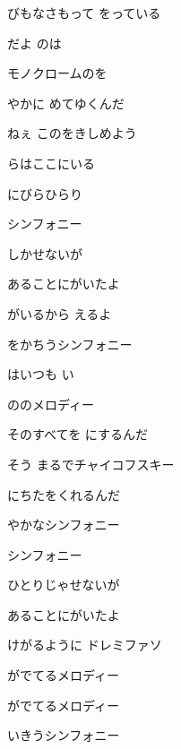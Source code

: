 \documentclass[14pt]{ltjsarticle}
\begin{document}
{  びもなさもって をっている
  \jisho{}

\item
  だよ のは
  \jisho{}

  
モノクロームのを
  \jisho{}

  やかに めてゆくんだ
  \jisho{}

  
ねぇ このをきしめよう
  \jisho{}

  らはここにいる
  \jisho{}

\item
  にびらひらり
  \jisho{}

  シンフォニー
  \jisho{}

  しかせないが
  \jisho{}

  
あることにがいたよ
  \jisho{}

  がいるから えるよ
  \jisho{}

  をかちうシンフォニー
  \jisho{}

\item
  はいつも い
  \jisho{}

  ののメロディー
  \jisho{}

  
そのすべてを にするんだ
  \jisho{}

  
そう まるでチャイコフスキー
  \jisho{}

  にちたをくれるんだ
  \jisho{}

\item
  やかなシンフォニー
  \jisho{}

  シンフォニー
  \jisho{}

  
ひとりじゃせないが
  \jisho{}

  
あることにがいたよ
  \jisho{}

  けがるように ドレミファソ
  \jisho{}

  がでてるメロディー
  \jisho{}

  がでてるメロディー
  \jisho{}

  いきうシンフォニー
  \jisho{}

  
}
\end{document}
